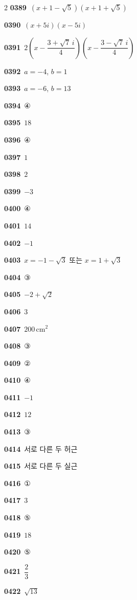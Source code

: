 \documentclass[10pt,a4paper]{article}
\begin{document}
\begin{multicols}{2}
\noindent\textbf{0389}\ $(x+1-\sqrt{5})(x+1+\sqrt{5})$\par
\noindent\textbf{0390}\ $(x+5i)(x-5i)$\par
\noindent\textbf{0391}\ $2\left(x-\dfrac{3+\sqrt{7}\,i}{4}\right)\left(x-\dfrac{3-\sqrt{7}\,i}{4}\right)$\par
\noindent\textbf{0392}\ $a=-4$, $b=1$\par
\noindent\textbf{0393}\ $a=-6$, $b=13$\par
\noindent\textbf{0394}\ ④\par
\noindent\textbf{0395}\ $18$\par
\noindent\textbf{0396}\ ④\par
\noindent\textbf{0397}\ $1$\par
\noindent\textbf{0398}\ $2$\par
\noindent\textbf{0399}\ $-3$\par
\noindent\textbf{0400}\ ④\par
\noindent\textbf{0401}\ $14$\par
\noindent\textbf{0402}\ $-1$\par
\noindent\textbf{0403}\ $x=-1-\sqrt{3}$ 또는 $x=1+\sqrt{3}$\par
\noindent\textbf{0404}\ ③\par
\noindent\textbf{0405}\ $-2+\sqrt{2}$\par
\noindent\textbf{0406}\ $3$\par
\noindent\textbf{0407}\ $200\,\mathrm{cm}^2$\par
\noindent\textbf{0408}\ ③\par
\noindent\textbf{0409}\ ②\par
\noindent\textbf{0410}\ ④\par
\noindent\textbf{0411}\ $-1$\par
\noindent\textbf{0412}\ $12$\par
\noindent\textbf{0413}\ ③\par
\noindent\textbf{0414}\ 서로 다른 두 허근\par
\noindent\textbf{0415}\ 서로 다른 두 실근\par
\noindent\textbf{0416}\ ①\par
\noindent\textbf{0417}\ $3$\par
\noindent\textbf{0418}\ ⑤\par
\noindent\textbf{0419}\ $18$\par
\noindent\textbf{0420}\ ⑤\par
\noindent\textbf{0421}\ $\dfrac{2}{3}$\par
\noindent\textbf{0422}\ $\sqrt{13}$\par

\end{multicols}
\end{document}
